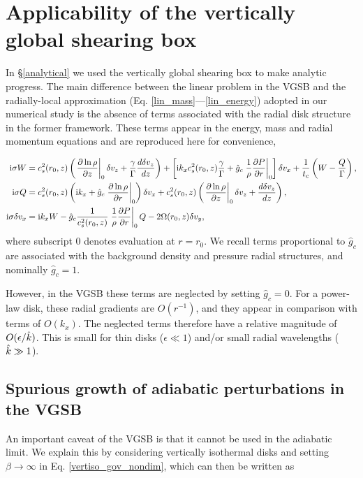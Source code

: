 \section{Applicability of the vertically global shearing box}\label{global_corr}
In \S\ref{analytical} we used the vertically global shearing box
\citep[VGSB,][]{mcnally14} to make analytic progress.   
The main difference between the linear problem in the VGSB 
and the radially-local approximation
(Eq. \ref{lin_mass}---\ref{lin_energy}) adopted in our numerical study
is the absence of  terms associated with the radial disk structure in
the former framework. These terms appear in the energy, mass and radial momentum
equations and are reproduced here for convenience,

\begin{align}
  \mathrm{i} \sigma W  &=c _s^2(r_0, z)\left( \left.\frac{\partial\ln\rho}{\partial
      z}\right|_0 \delta v_z + \frac{\gamma}{\Gamma} \frac{d\delta
    v_z}{dz}\right) + \left[\mathrm{i} k_xc_s^2(r_0,z)
  \frac{\gamma}{\Gamma} + \hat{g}_c\left.\frac{1}{\rho}\frac{\partial P}{\partial
      r}\right|_0\right]\delta v_x  +
\frac{1}{t_c}\left(W-\frac{Q}{\Gamma}\right),\label{gcorr_terms1}\\
\mathrm{i} \sigma Q &= c_s^2(r_0,z)\left(\mathrm{i} k_x + \hat{g}_c
  \left.\frac{\partial\ln{\rho}}{\partial r}\right|_0\right)\delta v_x + c _s^2(r_0, z)\left( \left.\frac{\partial\ln\rho}{\partial
      z}\right|_0 \delta v_z + \frac{d\delta
    v_z}{dz}\right),\label{gcorr_terms2} \\
\mathrm{i} \sigma \delta v_x & = \mathrm{i} k_x W  -
\hat{g}_c\frac{1}{c_s^2(r_0,z)}\left.\frac{1}{\rho}\frac{\partial P}{\partial
  r}\right|_0Q - 2\Omega(r_0,z)\delta v_y,\label{gcorr_terms3}
\end{align}
where subscript $0$ denotes evaluation at $r=r_0$. We recall terms
proportional to $\hat{g}_c$ are associated with the background density
and pressure radial structures, and nominally $\hat{g}_c=1$.   

However, in the VGSB these terms are neglected by 
setting $\hat{g}_c=0$. For a power-law disk, these radial gradients
are $O(r^{-1})$, and they appear in comparison with terms of
$O(k_x)$. The neglected terms  therefore have a relative magnitude of
$O(\epsilon/\hat{k})$. This is small for thin disks ($\epsilon\ll1$)
and/or small radial wavelengths ($\hat{k}\gg 1$).  

\subsection{Spurious growth of adiabatic perturbations in the VGSB}\label{analytic_adia} 
An important caveat of the VGSB is that it cannot be used in the
adiabatic limit. We explain this by considering vertically isothermal
disks and setting  $\beta\to\infty$ in 
Eq. \ref{vertiso_gov_nondim}, which can then be written as 

